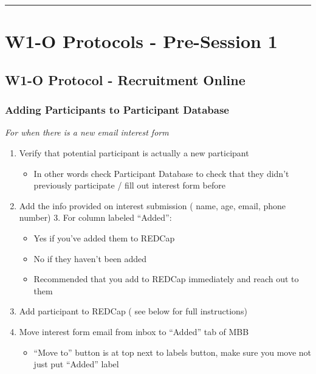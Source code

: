 \documentclass[]{book}
\providecommand{\tightlist}{%
  \setlength{\itemsep}{0pt}\setlength{\parskip}{0pt}}
\begin{document}
\begin{center}\rule{0.5\linewidth}{0.5pt}\end{center}

\hypertarget{w1-o-protocols---pre-session-1}{%
\section{W1-O Protocols - Pre-Session 1}\label{w1-o-protocols---pre-session-1}}

\hypertarget{w1-o-protocol---recruitment-online}{%
\subsection{W1-O Protocol - Recruitment Online}\label{w1-o-protocol---recruitment-online}}

\hypertarget{adding-participants-to-participant-database}{%
\subsubsection{Adding Participants to Participant Database}\label{adding-participants-to-participant-database}}

\emph{For when there is a new email interest form }

\begin{enumerate}
\def\labelenumi{\arabic{enumi}.}
\tightlist
\item
  Verify that potential participant is actually a new participant

  \begin{itemize}
  \tightlist
  \item
    In other words check Participant Database to check that they didn't previously participate / fill out interest form before
  \end{itemize}
\item
  Add the info provided on interest submission ( name, age, email, phone number) 3. For column labeled ``Added'':

  \begin{itemize}
  \tightlist
  \item
    Yes if you've added them to REDCap
  \item
    No if they haven't been added
  \item
    Recommended that you add to REDCap immediately and reach out to them
  \end{itemize}
\item
  Add participant to REDCap ( see below for full instructions)
\item
  Move interest form email from inbox to ``Added'' tab of MBB

  \begin{itemize}
  \tightlist
  \item
    ``Move to'' button is at top next to labels button, make sure you move not just put ``Added'' label
  \end{itemize}
\end{enumerate}
\end{document}
